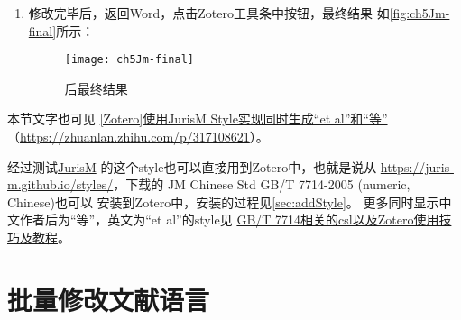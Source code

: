 \documentclass[cn,11pt,chinese]{elegantbook}
\begin{document}
\begin{enumerate}
			如果不正常，在Zotero库中将英文文献的“Language”字段修改为“en”
			\footnote{我遇到的不正常的情况是英文作者后面也是“等”，如果中文作者后面
			成了“et al”，可以尝试修改中文文献的“Language”字段修改为“cn”或“中文”试试。}，
			如\autoref{fig:ch5JmLanguage}所示：
			\begin{figure}[htbp]
				\centering
				\texttt{[image: ch5JmLanguage]}
				\caption{将英文文献的“Language”字段修改为“en”}
				\label{fig:ch5JmLanguage}
			\end{figure}
			\item 修改完毕后，返回Word，点击Zotero工具条中按钮，最终结果
			如\autoref{fig:ch5Jm-final}所示：
			\begin{figure}[htbp]
				\centering
				\texttt{[image: ch5Jm-final]}
				\caption{后最终结果}
				\label{fig:ch5Jm-final}
			\end{figure}
			\end{enumerate}
		
			本节文字也可见
		\href{https://zhuanlan.zhihu.com/p/317108621}
		{[Zotero]使用JurisM Style实现同时生成“et al”和“等”}
		（\url{https://zhuanlan.zhihu.com/p/317108621}）。

		经过测试\href{https://juris-m.github.io/release/}{JurisM}
		的这个style也可以直接用到Zotero中，也就是说从
		\url{https://juris-m.github.io/styles/}，下载的
		JM Chinese Std GB/T 7714-2005 (numeric, Chinese)也可以
		安装到Zotero中，安装的过程见\cref{sec:addStyle}。
		更多同时显示中文作者后为“等”，英文为“et al”的style见
		\href{https://github.com/redleafnew/Chinese-std-GB-T-7714-related-csl}
		{GB/T 7714相关的csl以及Zotero使用技巧及教程}。
		
	\section{批量修改文献语言}\label{sec:change_lan}	
\end{document}
